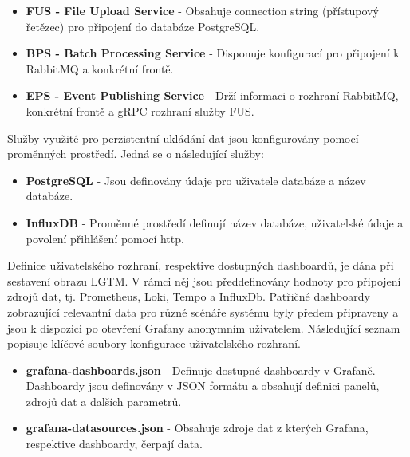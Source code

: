 \begin{itemize}
  \item \textbf{FUS - File Upload Service} - Obsahuje connection string (přístupový řetězec) pro připojení do databáze PostgreSQL.
  \item \textbf{BPS - Batch Processing Service} - Disponuje konfigurací pro připojení k RabbitMQ a konkrétní frontě.
  \item \textbf{EPS - Event Publishing Service} - Drží informaci o rozhraní RabbitMQ, konkrétní frontě a gRPC rozhraní služby FUS.
\end{itemize}


Služby využité pro perzistentní ukládání dat jsou konfigurovány pomocí proměnných prostředí. Jedná se o následující služby:

\begin{itemize}
  \item \textbf{PostgreSQL} - Jsou definovány údaje pro uživatele databáze a název databáze.
  \item \textbf{InfluxDB} - Proměnné prostředí definují název databáze, uživatelské údaje a povolení přihlášení pomocí http.
\end{itemize}


Definice uživatelského rozhraní, respektive dostupných dashboardů, je dána při sestavení obrazu LGTM. V rámci něj jsou předdefinovány hodnoty pro připojení zdrojů dat, tj. Prometheus, Loki, Tempo a InfluxDb. Patřičné dashboardy zobrazující relevantní data pro různé scénáře systému byly předem připraveny a jsou k dispozici po otevření Grafany anonymním uživatelem. Následující seznam popisuje klíčové soubory konfigurace uživatelského rozhraní.

\begin{itemize}
  \item \textbf{grafana-dashboards.json} - Definuje dostupné dashboardy v Grafaně. Dashboardy jsou definovány v JSON formátu a obsahují definici panelů, zdrojů dat a dalších parametrů.
  \item \textbf{grafana-datasources.json} - Obsahuje  zdroje dat z kterých Grafana, respektive dashboardy, čerpají data.
\end{itemize}
